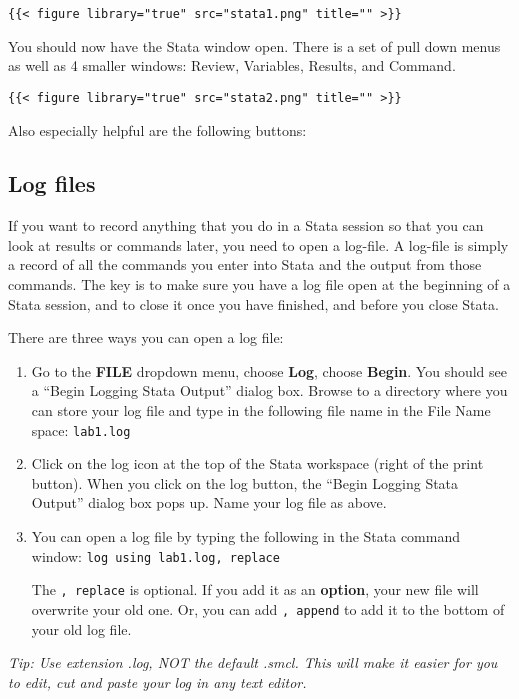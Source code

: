\documentclass[
]{article}
\begin{document}
\texttt{\{\{\textless{}\ figure\ library="true"\ src="stata1.png"\ title=""\ \textgreater{}\}\}}

You should now have the Stata window open. There is a set of pull down
menus as well as 4 smaller windows: Review, Variables, Results, and
Command.

\texttt{\{\{\textless{}\ figure\ library="true"\ src="stata2.png"\ title=""\ \textgreater{}\}\}}

Also especially helpful are the following buttons:

\hypertarget{log-files}{%
\subsection{Log files}\label{log-files}}

If you want to record anything that you do in a Stata session so that
you can look at results or commands later, you need to open a log-file.
A log-file is simply a record of all the commands you enter into Stata
and the output from those commands. The key is to make sure you have a
log file open at the beginning of a Stata session, and to close it once
you have finished, and before you close Stata.

There are three ways you can open a log file:

\begin{enumerate}
\def\labelenumi{\arabic{enumi}.}
\item
  Go to the \textbf{FILE} dropdown menu, choose \textbf{Log}, choose
  \textbf{Begin}. You should see a ``Begin Logging Stata Output'' dialog
  box. Browse to a directory where you can store your log file and type
  in the following file name in the File Name space: \texttt{lab1.log}
\item
  Click on the log icon at the top of the Stata workspace (right of the
  print button). When you click on the log button, the ``Begin Logging
  Stata Output'' dialog box pops up. Name your log file as above.
\item
  You can open a log file by typing the following in the Stata command
  window: \texttt{log\ using\ lab1.log,\ replace}

  The \texttt{,\ replace} is optional. If you add it as an
  \textbf{option}, your new file will overwrite your old one. Or, you
  can add \texttt{,\ append} to add it to the bottom of your old log
  file.
\end{enumerate}

\emph{Tip: Use extension .log, NOT the default .smcl. This will make it
easier for you to edit, cut and paste your log in any text editor.}
\end{document}
